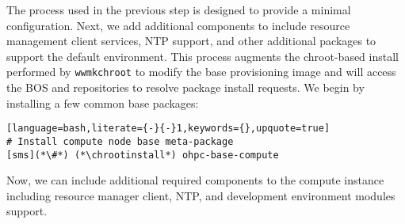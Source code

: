 The process used in the previous step is designed to
provide a minimal \baseOS{} configuration. Next, we add additional components
to include resource management client services, NTP support, and
other additional packages to support the default \OHPC{} environment. This
process augments the chroot-based install performed by \texttt{wwmkchroot} to
modify the base provisioning image and will access the BOS and \OHPC{}
repositories to resolve package install requests. We begin by installing a few
common base packages:

\begin{lstlisting}[language=bash,literate={-}{-}1,keywords={},upquote=true]
# Install compute node base meta-package
[sms](*\#*) (*\chrootinstall*) ohpc-base-compute
\end{lstlisting}

\noindent Now, we can include additional required components to the compute
instance including resource manager client, NTP, and development environment modules support.

